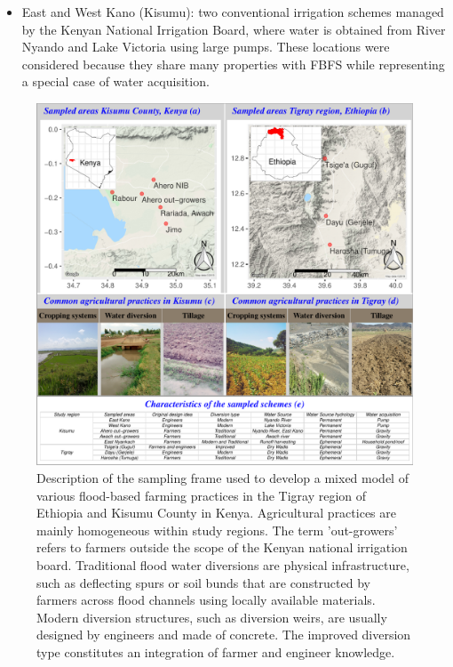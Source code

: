 \documentclass[]{elsarticle} %
\providecommand{\tightlist}{%
  \setlength{\itemsep}{0pt}\setlength{\parskip}{0pt}}
\begin{document}
\begin{itemize}
\tightlist
\item
  East and West Kano (Kisumu): two conventional irrigation schemes managed by the Kenyan National Irrigation Board, where water is obtained from River Nyando and Lake Victoria using large pumps. These locations were considered because they share many properties with FBFS while representing a special case of water acquisition.
\end{itemize}

\begin{figure}[!h]

{\centering \includegraphics[width=1\linewidth,]{figures/Modelling_FBFS_study_area} 

}

\caption{Description of the sampling frame used to develop a mixed model of various flood-based farming practices in the Tigray region of Ethiopia and Kisumu County in Kenya. Agricultural practices are mainly homogeneous within study regions. The term 'out-growers' refers to farmers outside the scope of the Kenyan national irrigation board. Traditional flood water diversions are physical infrastructure, such as deflecting spurs or soil bunds that are constructed by farmers across flood channels using locally available materials. Modern diversion structures, such as diversion weirs, are usually designed by engineers and made of concrete. The improved diversion type constitutes an integration of farmer and engineer knowledge.}\label{fig:fig1}
\end{figure}
\end{document}
